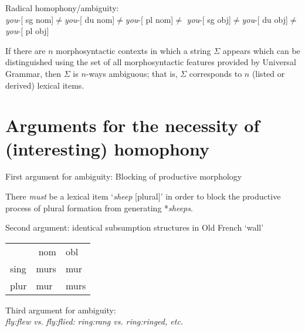 \documentclass[10pt]{article}
\begin{document}
\begin{example}\label{radamb}Radical homophony/ambiguity: \\ {\it you}-[{ sg nom}]$\neq${\it you}-[{ du nom}]$\neq${\it you}-[{ pl nom}]$\neq$  {\it you}-[{ sg obj}]$\neq${\it you}-[{ du obj}]$\neq${\it you}-[{ pl obj}]


If there are $n$ morphosyntactic contexts in which a string $\Sigma$ appears which can be distinguished using the set of all morphosyntactic features provided by Universal Grammar, then $\Sigma$ is $n$-ways ambiguous; that is, $\Sigma$ corresponds to $n$ (listed or derived) lexical items. 
\end{example}





\section{Arguments for the necessity of (interesting) homophony}





\begin{example}{First argument for ambiguity: Blocking of productive morphology}

 There {\it must} be a lexical item `{\it sheep} [{\sc plural}]' in order to block the productive process of plural formation from generating *{\it sheeps}.
\end{example}





\begin{example}{Second argument: identical subsumption structures in  Old French  `wall'}

\begin{tabular}{|l| l l|} \hline 
\multicolumn{2}{|r}{{\sc nom}}&{{\sc obl}}  \\ \cline{2-3} 
{{\sc sing}}&{murs}&{mur} \\ 
{{\sc plur}}&{mur}&{murs}  \\ \hline
\end{tabular}

\end{example}






\begin{example}{Third argument for ambiguity: \\ {\it fly:flew vs. fly:flied: ring:rang vs. ring:ringed, etc.}}
\end{example}
\end{document}
